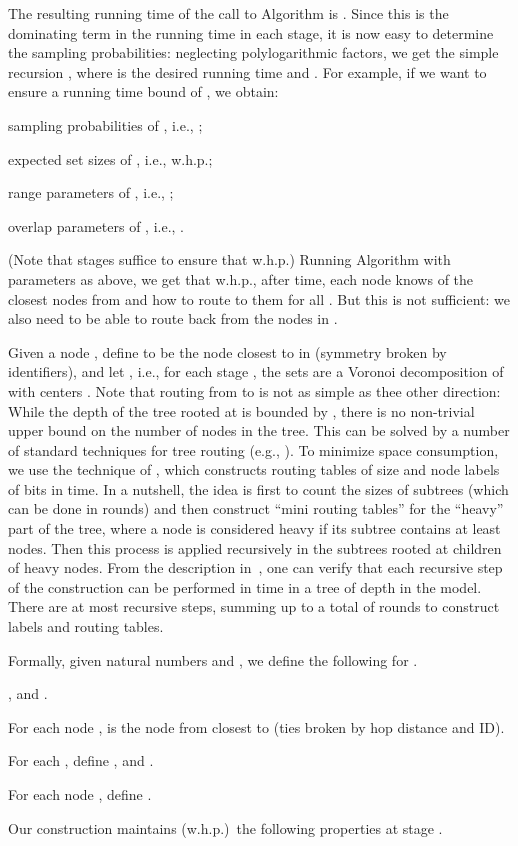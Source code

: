 \documentclass[letterpaper,11pt]{article}
\begin{document}
The resulting running time of the call to Algorithm  is
. Since this is the
dominating term in the running time in each stage, it is now easy to determine
the sampling probabilities: neglecting polylogarithmic factors, we get the
simple recursion , where  is the desired running time
and . For example, if we want to ensure a running time bound of
, we obtain: 
\begin{compactitem}
\item sampling probabilities of , i.e.,
;
\item expected set sizes of
, i.e.,  w.h.p.;
\item range parameters of , i.e., ;
\item overlap parameters of , i.e., .
\end{compactitem}
(Note that  stages suffice to ensure that  w.h.p.) Running Algorithm  with parameters as above, we
get that w.h.p., after  time, each node knows of the closest
 nodes from  and how to route to them for
all . But this is not sufficient: we also need to be able to route
back from the nodes in .

Given a node , define  to be the node closest to  in 
(symmetry broken by identifiers), and let , i.e., for each stage , the sets  are a Voronoi
decomposition of  with centers .
Note that routing from  to  is not as simple as thee other
direction: While the depth of the tree rooted at  is bounded by
, there is no non-trivial upper bound on the number of nodes in the tree.
This can be solved by a number of standard techniques for tree routing (e.g.,
\cite{SK}). To minimize space consumption, we use the technique of
\cite{TZ-routing}, which constructs routing tables of size  and
node labels of  bits in  time.
In a nutshell, the idea is first to count the sizes of subtrees (which can be
done in  rounds) and then construct ``mini routing tables'' for the
``heavy'' part of the tree, where a node is considered heavy if its subtree
contains at least  nodes. Then this process
is applied recursively in the subtrees rooted at children of heavy
nodes. From the description in~\cite{TZ-routing}, one can verify that each
recursive step of the construction can be performed in time  in
a tree of depth  in the  model. There are at most
 recursive steps, summing up to a total of
 rounds to construct labels and routing tables.

Formally, given natural numbers  and , we define the
following for .
\begin{compactitem}
\item  , and .
\item For each node ,  is  the node from  closest to
 (ties broken by hop distance and ID).
\item   For each , define
, and .
\item For each node , define .
\end{compactitem}
Our construction maintains (w.h.p.)\ the following
properties at stage .\vspace*{1ex}
\end{document}
